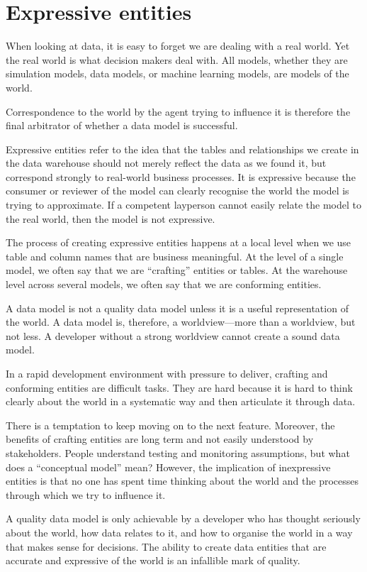 \documentclass[10pt,openany,10pt]{book}
\begin{document}
\section{Expressive entities}\label{expressive-entities}

When looking at data, it is easy to forget we are dealing with a real
world. Yet the real world is what decision makers deal with. All models,
whether they are simulation models, data models, or machine learning
models, are models of the world.

Correspondence to the world by the agent trying to influence it is
therefore the final arbitrator of whether a data model is successful.

Expressive entities refer to the idea that the tables and relationships
we create in the data warehouse should not merely reflect the data as we
found it, but correspond strongly to real-world business processes. It
is expressive because the consumer or reviewer of the model can clearly
recognise the world the model is trying to approximate. If a competent
layperson cannot easily relate the model to the real world, then the
model is not expressive.

The process of creating expressive entities happens at a local level
when we use table and column names that are business meaningful. At the
level of a single model, we often say that we are ``crafting'' entities
or tables. At the warehouse level across several models, we often say
that we are conforming entities.

A data model is not a quality data model unless it is a useful
representation of the world. A data model is, therefore, a
worldview---more than a worldview, but not less. A developer without a
strong worldview cannot create a sound data model.

In a rapid development environment with pressure to deliver, crafting
and conforming entities are difficult tasks. They are hard because it is
hard to think clearly about the world in a systematic way and then
articulate it through data.

There is a temptation to keep moving on to the next feature. Moreover,
the benefits of crafting entities are long term and not easily
understood by stakeholders. People understand testing and monitoring
assumptions, but what does a ``conceptual model'' mean? However, the
implication of inexpressive entities is that no one has spent time
thinking about the world and the processes through which we try to
influence it.

A quality data model is only achievable by a developer who has thought
seriously about the world, how data relates to it, and how to organise
the world in a way that makes sense for decisions. The ability to create
data entities that are accurate and expressive of the world is an
infallible mark of quality.
\end{document}
